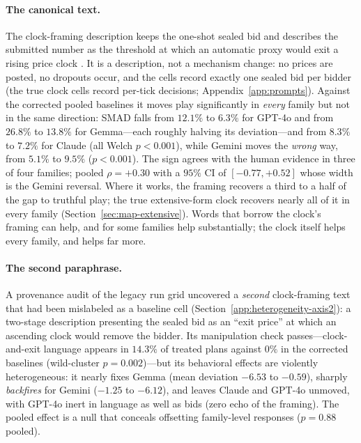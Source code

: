 \paragraph{The canonical text.}
The clock-framing description keeps the one-shot sealed bid and describes the submitted number as the threshold at which an automatic proxy would exit a rising price clock \citep{breitmoser2022obviousness}. It is a description, not a mechanism change: no prices are posted, no dropouts occur, and the cells record exactly one sealed bid per bidder (the true clock cells record per-tick decisions; Appendix~\ref{app:prompts}). Against the corrected pooled baselines it moves play significantly in \emph{every} family but not in the same direction: SMAD falls from $12.1\%$ to $6.3\%$ for GPT-4o and from $26.8\%$ to $13.8\%$ for Gemma---each roughly halving its deviation---and from $8.3\%$ to $7.2\%$ for Claude (all Welch $p < 0.001$), while Gemini moves the \emph{wrong} way, from $5.1\%$ to $9.5\%$ ($p < 0.001$). The sign agrees with the human evidence in three of four families; pooled $\rho = +0.30$ with a $95\%$ CI of $[-0.77, +0.52]$ whose width is the Gemini reversal. Where it works, the framing recovers a third to a half of the gap to truthful play; the true extensive-form clock recovers nearly all of it in every family (Section~\ref{sec:map-extensive}). Words that borrow the clock's framing can help, and for some families help substantially; the clock itself helps every family, and helps far more.

\paragraph{The second paraphrase.}
A provenance audit of the legacy run grid uncovered a \emph{second} clock-framing text that had been mislabeled as a baseline cell (Section~\ref{app:heterogeneity-axis2}): a two-stage description presenting the sealed bid as an ``exit price'' at which an ascending clock would remove the bidder. Its manipulation check passes---clock-and-exit language appears in $14.3\%$ of treated plans against $0\%$ in the corrected baselines (wild-cluster $p = 0.002$)---but its behavioral effects are violently heterogeneous: it nearly fixes Gemma (mean deviation $-6.53$ to $-0.59$), sharply \emph{backfires} for Gemini ($-1.25$ to $-6.12$), and leaves Claude and GPT-4o unmoved, with GPT-4o inert in language as well as bids (zero echo of the framing). The pooled effect is a null that conceals offsetting family-level responses ($p = 0.88$ pooled).


